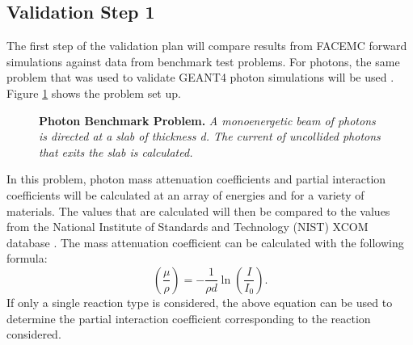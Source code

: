 \subsection{Validation Step 1}
The first step of the validation plan will compare results from FACEMC forward
simulations against data from benchmark test problems. For photons, the same
problem that was used to validate GEANT4 photon simulations will be used 
\citep{amako_comparison_2005}. Figure \ref{fig:photon_benchmark_problem} shows 
the problem set up.
\begin{figure}[t!]
  \begin{center}
  \end{center}
  \caption{\textbf{Photon Benchmark Problem.}
    \textit{A monoenergetic beam of photons is directed at a slab of thickness
      d. The current of uncollided photons that exits the slab is calculated.}}
  \label{fig:photon_benchmark_problem}
\end{figure}
In this problem, photon mass attenuation coefficients and partial interaction
coefficients will be calculated at an array of energies and for a variety of 
materials. The values that are calculated will then be compared to the values 
from the National Institute of Standards and Technology  (NIST) XCOM database 
\citep{amako_comparison_2005}. The mass attenuation coefficient can be 
calculated with the following formula:
\begin{equation}
  \left(\frac{\mu}{\rho}\right) = -\frac{1}{\rho d}
  \ln{\left(\frac{I}{I_0}\right)}.
\end{equation}
If only a single reaction type is considered, the above equation can be used
to determine the partial interaction coefficient corresponding to the reaction
considered.


